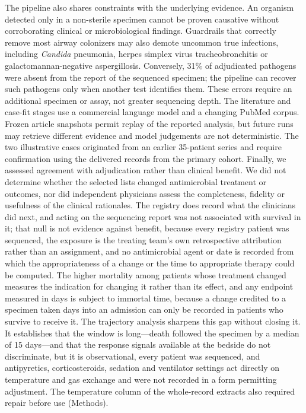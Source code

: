The pipeline also shares constraints with the underlying evidence. An organism detected only in a non-sterile specimen cannot be proven causative without corroborating clinical or microbiological findings. Guardrails that correctly remove most airway colonizers may also demote uncommon true infections, including \textit{Candida} pneumonia, herpes simplex virus tracheobronchitis or galactomannan-negative aspergillosis. Conversely, 31\% of adjudicated pathogens were absent from the \mngs report of the sequenced specimen; the pipeline can recover such pathogens only when another test identifies them. These errors require an additional specimen or assay, not greater sequencing depth. The literature and case-fit stages use a commercial language model and a changing PubMed corpus. Frozen article snapshots permit replay of the reported analysis, but future runs may retrieve different evidence and model judgements are not deterministic. The two illustrative cases originated from an earlier 35-patient series and require confirmation using the delivered records from the primary cohort. Finally, we assessed agreement with adjudication rather than clinical benefit. We did not determine whether the selected lists changed antimicrobial treatment or outcomes, nor did independent physicians assess the completeness, fidelity or usefulness of the clinical rationales. The registry does record what the clinicians did next, and acting on the sequencing report was not associated with survival in it; that null is not evidence against benefit, because every registry patient was sequenced, the exposure is the treating team's own retrospective attribution rather than an assignment, and no antimicrobial agent or date is recorded from which the appropriateness of a change or the time to appropriate therapy could be computed. The higher mortality among patients whose treatment changed measures the indication for changing it rather than its effect, and any endpoint measured in days is subject to immortal time, because a change credited to a specimen taken days into an admission can only be recorded in patients who survive to receive it. The trajectory analysis sharpens this gap without closing it. It establishes that the window is long---death followed the specimen by a median of 15 days---and that the response signals available at the bedside do not discriminate, but it is observational, every patient was sequenced, and antipyretics, corticosteroids, sedation and ventilator settings act directly on temperature and gas exchange and were not recorded in a form permitting adjustment. The temperature column of the whole-record extracts also required repair before use (Methods).

